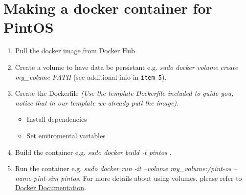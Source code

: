 \documentclass[12pt]{article}
\begin{document}
\maketitle

\section{Making a docker container for PintOS}

\begin{enumerate}
	\item Pull the docker image from Docker Hub
	\item Create a volume to have data be persistant e.g. \textit{sudo docker volume create my\_volume PATH} (see additional info in \texttt{item 5}).
	\item Create the Dockerfile \textit{(Use the template Dockerfile included to guide you, notice that in our template we already pull the image).}
	\begin{itemize}
		\item Install dependencies 
		\item Set enviromental variables 
	\end{itemize}
	\item Build the container e.g. \textit{sudo docker build -t pintos .}
	\item Run the container e.g. \textit{sudo docker run -it --volume my\_volume:/pint-os --name pint-sim pintos}. For more details about using volumes, please refer to \href{https://docs.docker.com/storage/volumes/}{Docker Documentation}.
	
\end{enumerate}
\end{document}
